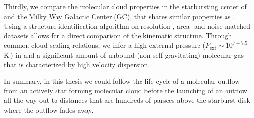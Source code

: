 Thirdly, we compare the molecular cloud properties in the starbursting center of  and the Milky Way Galactic Center (GC), that shares similar properties as .
Using a structure identification algorithm on resolution-, area- and noise-matched datasets allows for a direct comparison of the kinematic structure.
Through common cloud scaling relations, we infer a high external pressure ($P_\mathrm{ext} \sim 10^{7-7.5}$\,K\,) in  and a significant amount of unbound (non-self-gravitating) molecular gas that is characterized by high velocity dispersion.

In summary, in this thesis we could follow the life cycle of a molecular outflow from an actively star forming molecular cloud before the launching of an outflow all the way out to distances that are hundreds of parsecs above the starburst disk where the outflow fades away.



\newpage

